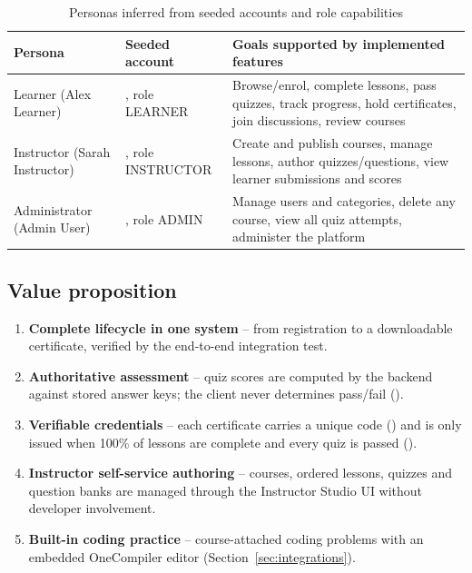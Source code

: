 \begin{table}[H]
\centering
\caption{Personas inferred from seeded accounts and role capabilities}
\label{tab:personas}
\begin{tabular}{@{}L{2.6cm}L{3.6cm}L{8.0cm}@{}}
\toprule
\textbf{Persona} & \textbf{Seeded account} & \textbf{Goals supported by implemented features} \\
\midrule
Learner (Alex Learner) & , role LEARNER & Browse/enrol, complete lessons, pass quizzes, track progress, hold certificates, join discussions, review courses \\
Instructor (Sarah Instructor) & , role INSTRUCT\-OR & Create and publish courses, manage lessons, author quizzes/questions, view learner submissions and scores \\
Administrator (Admin User) & , role ADMIN & Manage users and categories, delete any course, view all quiz attempts, administer the platform \\
\bottomrule
\end{tabular}
\end{table}

\subsection{Value proposition}

\begin{enumerate}
    \item \textbf{Complete lifecycle in one system} -- from registration to a downloadable certificate, verified by the end-to-end integration test.
    \item \textbf{Authoritative assessment} -- quiz scores are computed by the backend against stored answer keys; the client never determines pass/fail ().
    \item \textbf{Verifiable credentials} -- each certificate carries a unique code () and is only issued when 100\% of lessons are complete and every quiz is passed ().
    \item \textbf{Instructor self-service authoring} -- courses, ordered lessons, quizzes and question banks are managed through the Instructor Studio UI without developer involvement.
    \item \textbf{Built-in coding practice} -- course-attached coding problems with an embedded OneCompiler editor (Section~\ref{sec:integrations}).
\end{enumerate}

